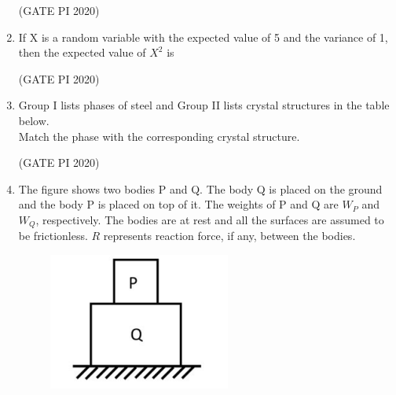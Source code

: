 \documentclass[journal,12pt,onecolumn]{IEEEtran}
\theoremstyle{remark}
\begin{document}
\begin{enumerate}
\hfill (GATE PI 2020)

\item If X is a random variable with the expected value of 5 and the variance of 1, then the expected value of $X^2$ is
\begin{enumerate}
\end{enumerate}

\hfill (GATE PI 2020)

\item Group I lists phases of steel and Group II lists crystal structures in the table below. \\




Match the phase with the corresponding crystal structure.
\begin{enumerate}
\end{enumerate}

\hfill (GATE PI 2020)

\item The figure shows two bodies P and Q. The body Q is placed on the ground and the body P is placed on top of it. The weights of P and Q are $W_P$ and $W_Q$, respectively. The bodies are at rest and all the surfaces are assumed to be frictionless. $R$ represents reaction force, if any, between the bodies.

\begin{figure}[H]
    \centering
    \includegraphics[width=0.4\columnwidth]{figs/fig5.png}
    \caption{}
    \label{fig:placeholder}
\end{figure}



\end{enumerate}
\end{document}
